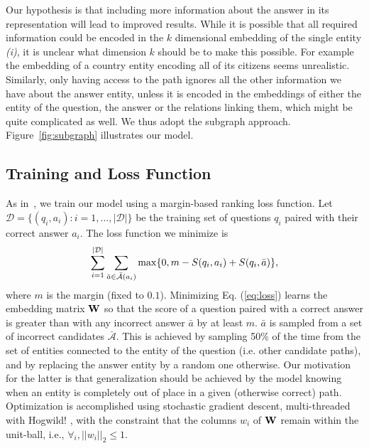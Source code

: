 \documentclass[runningheads,a4paper]{llncs}
\begin{document}
\label{sec:hypo}

Our hypothesis is that including more information about the answer in
its representation will lead to improved results. While it is possible
that all required information could be encoded in the $k$ dimensional
embedding of the single entity {\it (i)}, it is unclear what dimension
$k$ should be to make this possible. For example the embedding
of a country entity encoding all of its citizens seems unrealistic.
Similarly, only having access to the path ignores all the other
information we have about the answer entity, unless it is encoded in
the embeddings of either the entity of the question, the answer or the
relations linking them, which might be quite complicated
as well.  We thus adopt the subgraph approach.
Figure~\ref{fig:subgraph} illustrates our model. 





\subsection{Training and Loss Function}
As in~\cite{wsabie}, we train our model using a margin-based
ranking loss function.  Let $\mathcal{D} = \{(q_i, a_i): i = 1,
\ldots, |\mathcal{D}|\}$ be the training set of 
questions $q_i$ paired with their correct answer $a_i$. The loss
function we minimize is
\begin{equation} \label{eq:loss}
\sum_{i=1}^{|\mathcal{D}|} \sum_{\tiny{\bar{a} \in \bar{\mathcal{A}}(a_i)}}
\max\{0, m - S(q_i,a_i) + S(q_i,\bar{a})\}, 
\end{equation}
where $m$ is the margin (fixed to $0.1$).  Minimizing
Eq. (\ref{eq:loss}) learns the embedding matrix ${\bf W}$ so that the score
of a question paired with a correct answer is greater than with any
incorrect answer $\bar{a}$ by at least $m$. 
$\bar{a}$ is sampled from a set of incorrect candidates $\bar{\mathcal{A}}$.  
This is achieved by sampling 50\% of the
time from the set of entities connected to the entity of the question
(i.e. other candidate paths), and by replacing the
answer entity by a random one otherwise.
 Our motivation for the latter is that generalization should be
achieved by the model knowing when an entity is completely out of
place in a given (otherwise correct) path.  \fi
Optimization is accomplished using stochastic gradient descent,
multi-threaded with Hogwild!  \cite{recht2011hogwild}, with the 
constraint that the columns $w_i$ of ${\bf W}$ remain within the unit-ball, 
i.e., $\forall_i, ||w_i||_2 \le 1$.
\end{document}

